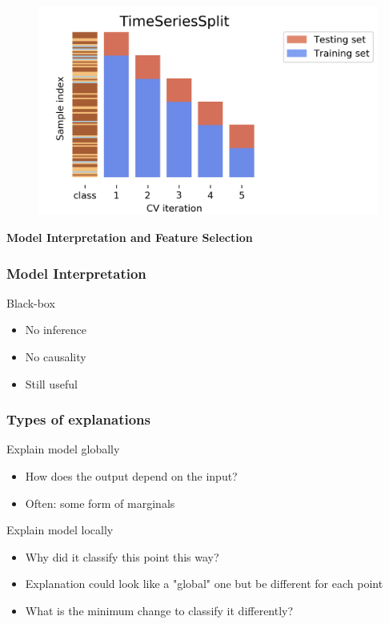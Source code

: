 \documentclass[compress, aspectratio=54]{beamer}
\begin{document}
\begin{frame}
\begin{figure}
\includegraphics[width=\linewidth ]{Figures/time-series-rolling2.png}
\end{figure}
\end{frame}


\begin{frame}
\begin{center}
\Large{\textbf{Model Interpretation and Feature Selection}}
\end{center}
\end{frame}

\begin{frame}
\frametitle{Model Interpretation}
Black-box
\begin{itemize}
\item No inference
\item No causality
\item Still useful
\end{itemize}
\end{frame}


\begin{frame}
\frametitle{Types of explanations}
Explain model globally

\begin{itemize}
	\item How does the output depend on the input?
	\item Often: some form of marginals
\end{itemize}

Explain model locally
\begin{itemize}
	\item Why did it classify this point this way?

	\item Explanation could look like a "global" one but be different for each point
	\item What is the minimum change to classify it differently?
	\end{itemize}
\end{frame}
\end{document}

